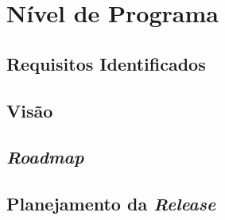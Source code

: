 \chapter[Nível de Programa]{Nível de Programa}

\section{Requisitos Identificados}

\section{Visão}

\section{\textit{Roadmap}}

\section{Planejamento da \textit{Release}}